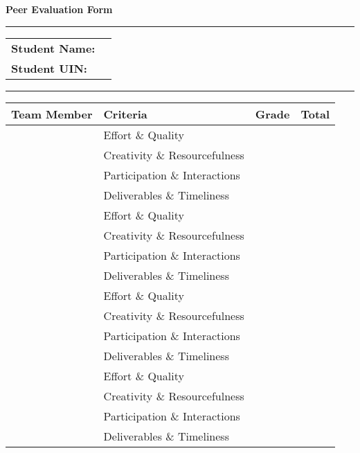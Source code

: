 \documentclass[11pt]{article}
\begin{document}
\begin{center}
{\bfseries \LARGE Peer Evaluation Form}
\end{center}


\noindent
\rule[1mm]{\linewidth}{0.2pt}
\begin{center}
\begin{tabular}{p{0.9\linewidth}}
\textbf{Student Name:}\\
\textbf{Student UIN:}
\end{tabular}
\end{center}
\rule[1mm]{\linewidth}{0.2pt}

\begin{center}
\begin{tabular}{|p{4cm}|p{6cm}|p{2cm}|p{2cm}|}
\hline
\textbf{Team Member} & \textbf{Criteria} & \textbf{Grade} & \textbf{Total} \\
\hline
& Effort \& Quality & & \\
& Creativity \& Resourcefulness & & \\
& Participation \& Interactions & & \\
& Deliverables \& Timeliness & & \\
\hline
\hline
& Effort \& Quality & & \\
& Creativity \& Resourcefulness & & \\
& Participation \& Interactions & & \\
& Deliverables \& Timeliness & & \\
\hline
\hline
& Effort \& Quality & & \\
& Creativity \& Resourcefulness & & \\
& Participation \& Interactions & & \\
& Deliverables \& Timeliness & & \\
\hline
& Effort \& Quality & & \\
& Creativity \& Resourcefulness & & \\
& Participation \& Interactions & & \\
& Deliverables \& Timeliness & & \\
\hline
\end{tabular}
\end{center}
\end{document}
